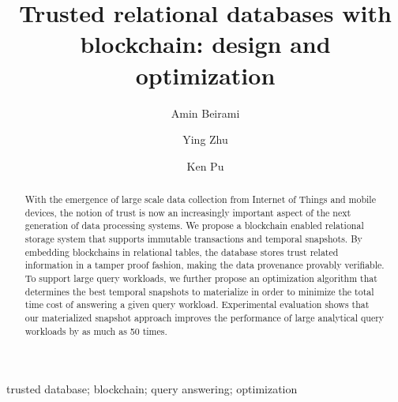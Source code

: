 \title{Trusted relational databases with blockchain: design and optimization}


\author[a]{Amin Beirami}
\author[b]{Ying Zhu}
\author[a]{Ken Pu}

\address[a]{Faculty of Science, UOIT, Oshawa, ON, Canada}
\address[b]{Faculty of Business and IT, UOIT, Oshawa, ON, Canada}

\begin{abstract}
    With the emergence of large scale data collection from Internet of Things
    and mobile devices, the notion of trust is now an increasingly
    important aspect of the next generation of data processing
    systems. We propose a blockchain enabled relational storage system that
    supports immutable transactions and temporal snapshots.  By embedding
    blockchains in relational tables, the database stores trust related
    information in a tamper proof fashion, making the data provenance provably
    verifiable.
    To support large query workloads, we further propose an optimization
    algorithm that determines the best temporal snapshots to materialize in
    order to minimize the total
    time cost of answering a given query workload. Experimental evaluation
    shows that our materialized snapshot approach improves the performance of
    large analytical query workloads by as much as 50 times.
\end{abstract}

\begin{keyword}
    trusted database; blockchain; query answering; optimization
\end{keyword}
